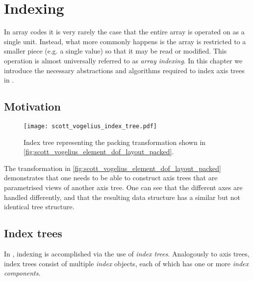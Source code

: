 \documentclass[thesis]{subfiles}
\begin{document}
\chapter{Indexing}
\label{chapter:indexing}

In array codes it is very rarely the case that the entire array is operated on as a single unit.
Instead, what more commonly happens is the array is restricted to a smaller piece (e.g. a single value) so that it may be read or modified.
This operation is almost universally referred to as \textit{array indexing}.
In this chapter we introduce the necessary abstractions and algorithms required to index axis trees in .

\section{Motivation}  %

\begin{figure}
  \centering
  \texttt{[image: scott\_vogelius\_index\_tree.pdf]}
  \caption{Index tree representing the packing transformation shown in \cref{fig:scott_vogelius_element_dof_layout_packed}.}
  \label{fig:scott_vogelius_element_index_tree}
\end{figure}



The transformation in \cref{fig:scott_vogelius_element_dof_layout_packed} demonstrates that one needs to be able to construct axis trees that are parametrised views of another axis tree.
One can see that the different axes are handled differently, and that the resulting data structure has a similar but not identical tree structure.

\section{Index trees}
\label{sec:index_trees}

In , indexing is accomplished via the use of \textit{index trees}.
Analogously to axis trees, index trees consist of multiple \textit{index} objects, each of which has one or more \textit{index components}.

\end{document}
